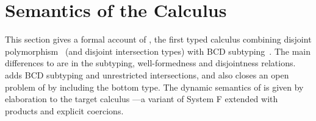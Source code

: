 
\section{Semantics of the \fnamee Calculus}
\label{sec:typesystem}


This section gives a formal account of \fnamee, the first typed calculus combining
disjoint polymorphism~\cite{alpuimdisjoint} (and disjoint intersection
types) with BCD
subtyping~\cite{Barendregt_1983}. The main differences to \fname are in the
subtyping, well-formedness and disjointness relations. \fnamee adds
BCD subtyping and unrestricted intersections, and also closes an open problem of
\fname by including the bottom type.
The dynamic semantics
of \fnamee is given by elaboration to the target calculus \tnamee---a variant of
System F extended with products and explicit coercions.



